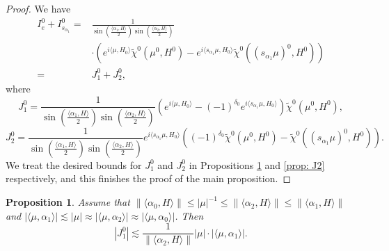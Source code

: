 \documentclass{amsart}
\numberwithin{equation}{section}
\newtheorem{prop}[thm]{Proposition}
\numberwithin{equation}{section}
\begin{document}
\begin{proof}
We have 
\begin{align}
    I^0_{e}+I^0_{s_{\alpha_1}}=&\frac{1}{\sin\left(\frac{\langle\alpha_1, H\rangle}{2}\right)\sin\left(\frac{\langle\alpha_2, H\rangle}{2}\right)}\nonumber\\
    &\cdot 
    \left(e^{i\langle \mu, H_{0}\rangle}\widetilde{\chi}^0({\mu^0}, H^0)-e^{i\langle s_{\alpha_1}\mu, H_{0}\rangle}\widetilde{\chi}^0({(s_{\alpha_1}\mu)^0}, H^0)\right)\nonumber\\
    =&J^0_1+J^0_2,\label{eq: cancellation case 2}
    \end{align}
    where 
     $$J^0_1=\frac{1}{ \sin\left(\frac{\langle\alpha_1, H\rangle}{2}\right)\sin\left(\frac{\langle\alpha_2, H\rangle}{2}\right)}\left(e^{i\langle \mu, H_{0}\rangle}-(-1)^{\delta_0} e^{i\langle s_{\alpha_1}\mu, H_{0}\rangle}\right)\widetilde{\chi}^0({\mu^0}, H^0),$$
    $$J^0_2=\frac{1}{ \sin\left(\frac{\langle\alpha_1, H\rangle}{2}\right)\sin\left(\frac{\langle\alpha_2, H\rangle}{2}\right)}
    e^{i\langle s_{\alpha_1}\mu, H_{0}\rangle}\left((-1)^{\delta_0}\widetilde{\chi}^0({\mu^0}, H^0)-\widetilde{\chi}^0({(s_{\alpha_1}\mu)^0}, H^0)\right).$$
We treat the desired bounds for $J^0_1$ and $J^0_2$ in Propositions \ref{prop: J1} and \ref{prop: J2} respectively, and this finishes the proof of the main proposition.  
\end{proof}

    \begin{prop}\label{prop: J1}
    Assume that $\|\langle\alpha_0, H\rangle\|\leq|\mu|^{-1}\leq  \|\langle\alpha_2, H\rangle\|\leq \|\langle\alpha_1, H\rangle\|$ and $| \langle\mu,\alpha_1\rangle|\lesssim |\mu|\approx |\langle\mu,\alpha_2\rangle|\approx |\langle\mu,\alpha_0\rangle|$.  Then 
        $$|J^0_1|\lesssim \frac{1}{\|\langle\alpha_2, H\rangle\|}|\mu|\cdot |\langle \mu, \alpha_1  \rangle|.$$
    \end{prop}
   
\end{document}
